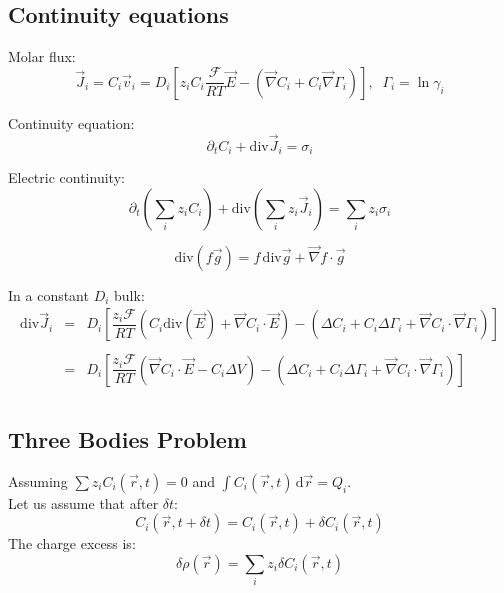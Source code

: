 \documentclass[aps,12pt]{revtex4}
\begin{document}
\subsection{Continuity equations}

Molar flux:
\begin{equation}
	\vec{J}_i = C_i \vec{v}_i = D_i \left[z_i C_i  \dfrac{\mathcal{F}}{RT} \vec{E} - \left(\vec{\nabla} C_i + C_i \vec{\nabla}\Gamma_i\right) \right],\;\;\Gamma_i = \ln \gamma_i
\end{equation}

Continuity equation:
\begin{equation}
	\partial_t C_i + \mathrm{div} \vec{J}_i = \sigma_i
\end{equation}

Electric continuity:
\begin{equation}
	\partial_t \left(\sum_i z_i C_i\right) + \mathrm{div} \left(\sum_i z_i \vec{J}_i\right) = \sum_i z_i \sigma_i
\end{equation}


\begin{equation}
	\mathrm{div}(f\vec{g}) = f \, \mathrm{div}\vec{g} + \vec{\nabla} f \cdot \vec{g}
\end{equation}

In a constant $D_i$ bulk:
\begin{equation}
\begin{array}{rcl}
\mathrm{div} \vec{J}_i & = & D_i \left[ \dfrac{z_i\mathcal{F}}{RT} 
\left(C_i \mathrm{div}\left(\vec{E}\right) + \vec{\nabla} C_i \cdot \vec{E} \right) 
- \left( \Delta C_i + C_i \Delta \Gamma_i + \vec{\nabla} C_i \cdot \vec{\nabla} \Gamma_i \right)
\right]\\
\\
 & = &  D_i \left[ \dfrac{z_i\mathcal{F}}{RT} 
\left(  \vec{\nabla} C_i \cdot \vec{E} - C_i \Delta V \right) 
- \left( \Delta C_i + C_i \Delta \Gamma_i + \vec{\nabla} C_i \cdot \vec{\nabla} \Gamma_i \right)
\right]\\
\end{array}
\end{equation}

\subsection{Three Bodies Problem}

 	
Assuming $\sum z_i C_i(\vec{r},t) = 0$ and $\int C_i(\vec{r},t) \, \mathrm{d}\vec{r} = Q_i$.\\
Let us assume that after $\delta t$:
\begin{equation}
	C_i(\vec{r},t+\delta t) = C_i(\vec{r},t) + \delta C_i(\vec{r},t)
\end{equation}
The charge excess is:
\begin{equation}
	\delta \rho(\vec{r}) = \sum_i z_i \delta C_i(\vec{r},t)
\end{equation}
\end{document}
